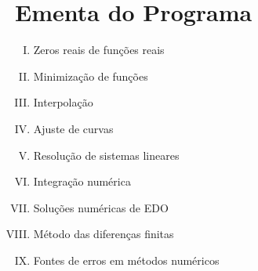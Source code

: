 \section{Ementa do Programa}

\setlength{\columnseprule}{1pt}
\setlength{\columnsep}{20pt}

\begin{multicols}{2}

	\begin{enumerate}[I.]

		\item Zeros reais de funções reais
		\item Minimização de funções
		\item Interpolação
		\item Ajuste de curvas
		\item Resolução de sistemas lineares
		\item Integração numérica
		\item Soluções numéricas de EDO
		\item Método das diferenças finitas
		\item Fontes de erros em métodos numéricos

 	\end{enumerate}

\end{multicols}
